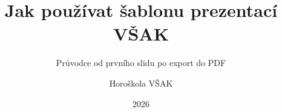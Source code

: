\title[Jak používat šablonu VŠAK]{Jak používat šablonu prezentací VŠAK}
\subtitle{Průvodce od prvního slidu po export do PDF}
\author{Horoškola VŠAK}
\date{2026}

\renewcommand{\vsakTitleSideItems}{%
  \item Začínáme
  \item Layouty
  \item Komponenty
  \item Kontrola
}
